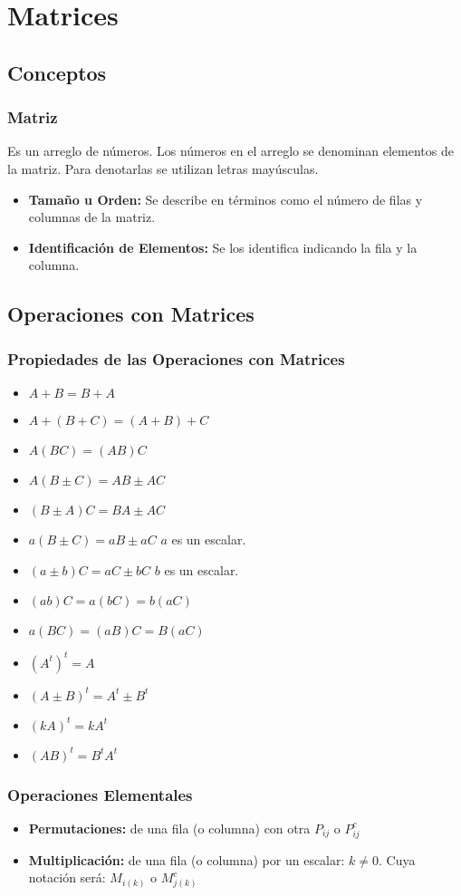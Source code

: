 \chapter{Matrices}
\section{Conceptos}
\subsection{Matriz}
Es un arreglo de números. Los números en el arreglo se denominan elementos de la matriz. Para denotarlas se utilizan letras mayúsculas.
\begin{itemize}
\item \textbf{Tamaño u Orden:} Se describe en términos como el número de filas y columnas de la matriz.
\item \textbf{Identificación de Elementos:} Se los identifica indicando la fila y la columna.
\end{itemize}
\section{Operaciones con Matrices}
\subsection{Propiedades de las Operaciones con Matrices}
\begin{itemize}
\item $A+B=B+A$
\item $A+(B+C)=(A+B)+C$
\item $A(BC)=(AB)C$
\item $A(B\pm C)=AB\pm AC$
\item $(B\pm A)C = BA\pm AC$
\item $a(B\pm C)= aB\pm aC$ \hspace{1cm} $a$ es un escalar.
\item $(a\pm b)C = aC\pm bC$ \hspace{1cm} $b$ es un escalar.
\item $(ab)C = a(bC) = b(aC)$
\item $a(BC)=(aB)C=B(aC)$
\item $(A^t)^t=A$
\item $(A\pm B)^t=A^t \pm B^t$
\item $(kA)^t=kA^t$
\item $(AB)^t = B^t A^t$
\end{itemize}
\subsection{Operaciones Elementales}
\begin{itemize}
\item \textbf{Permutaciones:} de una fila (o columna) con otra $P_{ij}$ o $P_{ij}^c$
\item \textbf{Multiplicación:} de una fila (o columna) por un escalar: $k\neq 0$. Cuya notación será: $M_{i(k)}$ o $M_{j(k)}^c$
\end{itemize}
